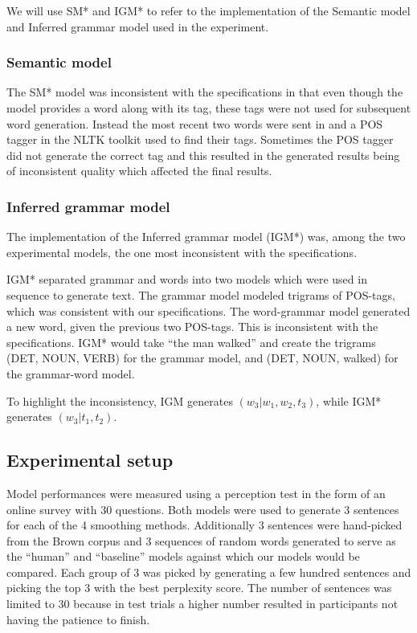 \documentclass[a4paper,12pt]{article}
\begin{document}
We will use SM* and IGM* to refer to the implementation of the Semantic model and Inferred grammar model used in the experiment.

\subsubsection{Semantic model}
The SM* model was inconsistent with the specifications in that even though the model provides a word along with its tag, these tags were not used for subsequent word generation. Instead the most recent two words were sent in and a POS tagger in the NLTK toolkit used to find their tags. Sometimes the POS tagger did not generate the correct tag and this resulted in the generated results being of inconsistent quality which affected the final results.  


\subsubsection{Inferred grammar model}
The implementation of the Inferred grammar model (IGM*) was, among the two experimental models, the one most inconsistent with the specifications. 

IGM* separated grammar and words into two models which were used in sequence to generate text. The grammar model modeled trigrams of POS-tags, which was consistent with our specifications. The word-grammar model generated a new word, given the previous two POS-tags. This is inconsistent with the specifications. IGM* would take ``the man walked'' and create the trigrams (DET, NOUN, VERB) for the grammar model, and (DET, NOUN, walked) for the grammar-word model.

To highlight the inconsistency, IGM generates $(w_3|w_1,w_2,t_3)$, while IGM* generates $(w_3 | t_1,t_2)$.

\subsection{Experimental setup}
\label{sec:expiremental_setup}
Model performances were measured using a perception test in the form of an online survey with 30 questions. Both models were used to generate 3 sentences for each of the 4 smoothing methods.  Additionally 3 sentences were hand-picked from the Brown corpus and 3 sequences of random words generated to serve as the ``human'' and ``baseline'' models against which our models would be compared. Each group of 3 was picked by generating a few hundred sentences and picking the top 3 with the best perplexity score. The number of sentences was limited to 30 because in test trials a higher number resulted in participants not having the patience to finish. 
\end{document}
